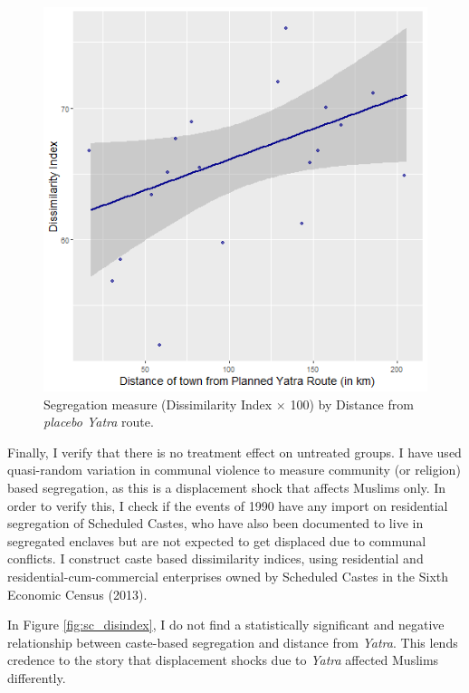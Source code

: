 \documentclass{article}
\begin{document}
\begin{figure}[H]
    \centering
    \includegraphics[scale = 0.6]{images/graph_disindex_p.png}
    \caption{Segregation measure (Dissimilarity Index $\times$ 100) by Distance from \textit{placebo Yatra} route.}
    \label{fig:disindex_p}
\end{figure}

Finally, I verify that there is no treatment effect on untreated groups. I have used quasi-random variation in communal violence to measure community (or religion) based segregation, as this is a displacement shock that affects Muslims only. In order to verify this, I check if the events of 1990 have any import on residential segregation of Scheduled Castes, who have also been documented to live in segregated enclaves \citep{bharathi2018isolated} but are not expected to get displaced due to communal conflicts. I construct caste based dissimilarity indices, using residential and residential-cum-commercial enterprises owned by Scheduled Castes in the Sixth Economic Census (2013).

In Figure \ref{fig:sc_disindex}, I do not find a statistically significant and negative relationship between caste-based segregation and distance from \textit{Yatra}. This lends credence to the story that displacement shocks due to \textit{Yatra} affected Muslims differently. 
\end{document}
